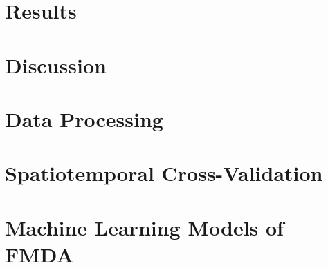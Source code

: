 \documentclass[11pt]{article}%
\begin{document}
\section{Results}

\section{Discussion}



\newpage




\appendix
\section{Data Processing} 
\label{app:data}

\section{Spatiotemporal Cross-Validation} \label{app:cv}
\section{Machine Learning Models of FMDA} \label{app:ml}
\end{document}
